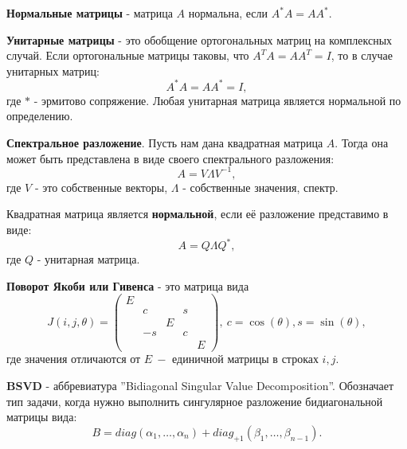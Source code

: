 \textbf{Нормальные матрицы} - матрица \(A\) нормальна, если \(A^*A=AA^*\).

\textbf{Унитарные матрицы} - это обобщение ортогональных матриц на комплексных случай. Если ортогональные матрицы таковы, что \(A^TA=AA^T=I\), то в случае унитарных матриц:
\[A^*A=AA^*=I,\]
где \(*\) - эрмитово сопряжение. Любая унитарная матрица является нормальной по определению.

\textbf{Спектральное разложение}. Пусть нам дана квадратная матрица \(A\). Тогда она может быть представлена в виде своего спектрального разложения:
\[ A=V\Lambda V^{-1},\]
 где \(V\) - это собственные векторы, \(\Lambda\) - собственные значения, спектр.

Квадратная матрица является \textbf{нормальной}, если её разложение представимо в виде:
\[A=Q \Lambda Q^*,\]
где \(Q\) - унитарная матрица. 

\textbf{Поворот Якоби или Гивенса} - это матрица вида
\[ \label{eq:2:1}
    J(i,j,\theta) = 
    \begin{pmatrix}E&&&&\\
        &c&&s\\
        &&E&&\\
        &-s&&c\\
        &&&&E
    \end{pmatrix},\
    c = \cos(\theta), s =\sin(\theta), 
\]
где значения отличаются от \(E\ - \) единичной матрицы в строках \(i, j\).

\textbf{BSVD} - аббревиатура ''Bidiagonal Singular Value Decomposition''. Обозначает тип задачи, когда нужно выполнить сингулярное разложение бидиагональной матрицы вида:
\[
        B= diag(\alpha_1,\dots,\alpha_n)+diag_{+1}(\beta_1,\dots,\beta_{n-1}).
\]

